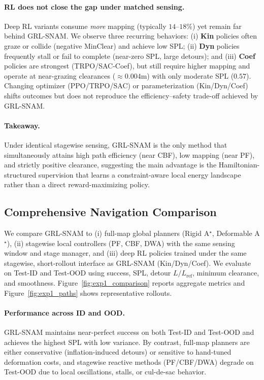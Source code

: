 \paragraph{RL does not close the gap under matched sensing.}
Deep RL variants consume \emph{more} mapping (typically $14$--$18\%$) yet remain far behind GRL-SNAM. We observe three recurring behaviors:
(i) \textbf{Kin} policies often graze or collide (negative MinClear) and achieve low SPL; 
(ii) \textbf{Dyn} policies frequently stall or fail to complete (near-zero SPL, large detours); and 
(iii) \textbf{Coef} policies are strongest (TRPO/SAC-Coef), but still require higher mapping and operate at near-grazing clearances ($\approx 0.004$m) with only moderate SPL ($0.57$). 
Changing optimizer (PPO/TRPO/SAC) or parameterization (Kin/Dyn/Coef) shifts outcomes but does not reproduce the efficiency--safety trade-off achieved by GRL-SNAM.

\paragraph{Takeaway.}
Under identical stagewise sensing, GRL-SNAM is the only method that simultaneously attains high path efficiency (near CBF), low mapping (near PF), and strictly positive clearance, suggesting the main advantage is the Hamiltonian-structured supervision that learns a constraint-aware local energy landscape rather than a direct reward-maximizing policy.


\subsection{Comprehensive Navigation Comparison}
\label{subsec:comprehensive_nav}

We compare GRL-SNAM to (i) full-map global planners (Rigid A$^{\star}$, Deformable A$^{\star}$), 
(ii) stagewise local controllers (PF, CBF, DWA) with the same sensing window and stage manager, 
and (iii) deep RL policies trained under the same stagewise, short-rollout interface as GRL-SNAM (Kin/Dyn/Coef).
We evaluate on Test-ID and Test-OOD using success, SPL, detour $L/L_{\mathrm{ref}}$, minimum clearance, and smoothness.
Figure~\ref{fig:exp1_comparison} reports aggregate metrics and Figure~\ref{fig:exp1_paths} shows representative rollouts.

\paragraph{Performance across ID and OOD.}
GRL-SNAM maintains near-perfect success on both Test-ID and Test-OOD and achieves the highest SPL with low variance.
By contrast, full-map planners are either conservative (inflation-induced detours) or sensitive to hand-tuned deformation costs, and stagewise reactive methods (PF/CBF/DWA) degrade on Test-OOD due to local oscillations, stalls, or cul-de-sac behavior.

